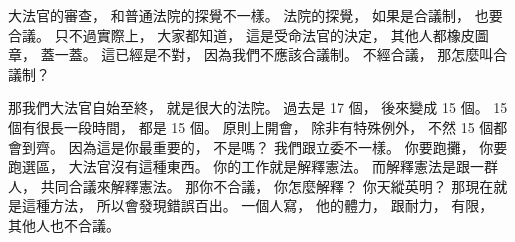 \hypertarget{w01:cue:1008}{}大法官的審查，
\hypertarget{w01:cue:1009}{}和普通法院的探覺不一樣。
\hypertarget{w01:cue:1010}{}法院的探覺，
\hypertarget{w01:cue:1011}{}如果是合議制，
\hypertarget{w01:cue:1012}{}也要合議。
\hypertarget{w01:cue:1013}{}只不過實際上，
\hypertarget{w01:cue:1014}{}大家都知道，
\hypertarget{w01:cue:1015}{}這是受命法官的決定，
\hypertarget{w01:cue:1016}{}其他人都橡皮圖章，
\hypertarget{w01:cue:1017}{}蓋一蓋。
\hypertarget{w01:cue:1018}{}這已經是不對，
\hypertarget{w01:cue:1019}{}因為我們不應該合議制。
\hypertarget{w01:cue:1020}{}不經合議，
\hypertarget{w01:cue:1021}{}那怎麼叫合議制？

\hypertarget{w01:cue:1022}{}那我們大法官自始至終，
\hypertarget{w01:cue:1023}{}就是很大的法院。
\hypertarget{w01:cue:1024}{}過去是 17 個，
\hypertarget{w01:cue:1025}{}後來變成 15 個。
\hypertarget{w01:cue:1026}{}15 個有很長一段時間，
\hypertarget{w01:cue:1027}{}都是 15 個。
\hypertarget{w01:cue:1028}{}原則上開會，
\hypertarget{w01:cue:1029}{}除非有特殊例外，
\hypertarget{w01:cue:1030}{}不然 15 個都會到齊。
\hypertarget{w01:cue:1031}{}因為這是你最重要的，
\hypertarget{w01:cue:1032}{}不是嗎？
\hypertarget{w01:cue:1033}{}我們跟立委不一樣。
\hypertarget{w01:cue:1034}{}你要跑攤，
\hypertarget{w01:cue:1035}{}你要跑選區，
\hypertarget{w01:cue:1036}{}大法官沒有這種東西。
\hypertarget{w01:cue:1037}{}你的工作就是解釋憲法。
\hypertarget{w01:cue:1038}{}而解釋憲法是跟一群人，
\hypertarget{w01:cue:1039}{}共同合議來解釋憲法。
\hypertarget{w01:cue:1040}{}那你不合議，
\hypertarget{w01:cue:1041}{}你怎麼解釋？
\hypertarget{w01:cue:1042}{}你天縱英明？
\hypertarget{w01:cue:1043}{}那現在就是這種方法，
\hypertarget{w01:cue:1044}{}所以會發現錯誤百出。
\hypertarget{w01:cue:1045}{}一個人寫，
\hypertarget{w01:cue:1046}{}他的體力，
\hypertarget{w01:cue:1047}{}跟耐力，
\hypertarget{w01:cue:1048}{}有限，
\hypertarget{w01:cue:1049}{}其他人也不合議。

